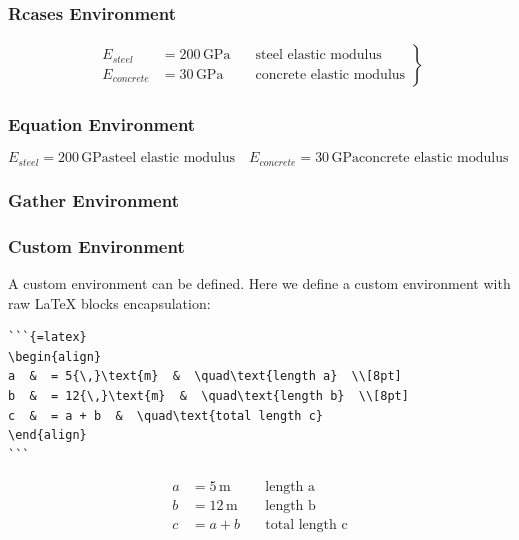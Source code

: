 \documentclass[
  letterpaper,
  DIV=11,
  numbers=noendperiod,
  fleqn]{scrartcl}
\begin{document}
\subsubsection{Rcases Environment}\label{rcases-environment}

\begin{align}
    \left.\begin{aligned}
E_{steel} & = 200{\,}\text{GPa} & \quad\text{steel elastic modulus}  \\[8pt]
 E_{concrete} & = 30{\,}\text{GPa} & \quad\text{concrete elastic modulus} 
    \end{aligned}\right\}
\end{align}

\subsubsection{Equation Environment}\label{equation-environment}

\begin{equation}
E_{steel}  = 200{\,}\text{GPa}  \text{steel elastic modulus}\quad E_{concrete}  = 30{\,}\text{GPa}  \text{concrete elastic modulus}\quad 
\end{equation}

\subsubsection{Gather Environment}\label{gather-environment}

\subsubsection{Custom Environment}\label{custom-environment}

A custom environment can be defined. Here we define a custom environment
with raw LaTeX blocks encapsulation:

\begin{verbatim}
```{=latex}
\begin{align}
a  &  = 5{\,}\text{m}  &  \quad\text{length a}  \\[8pt]
b  &  = 12{\,}\text{m}  &  \quad\text{length b}  \\[8pt]
c  &  = a + b  &  \quad\text{total length c} 
\end{align}
```
\end{verbatim}

\begin{align}
a  &  = 5{\,}\text{m}  &  \quad\text{length a}  \\[8pt]
b  &  = 12{\,}\text{m}  &  \quad\text{length b}  \\[8pt]
c  &  = a + b  &  \quad\text{total length c} 
\end{align}
\end{document}
